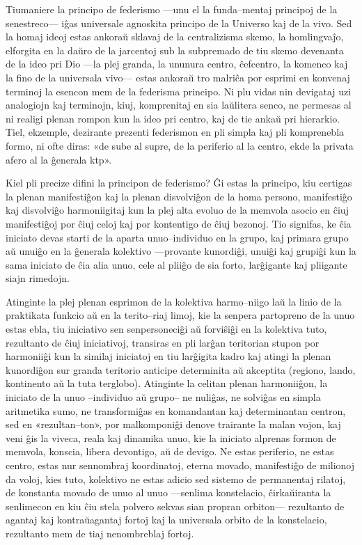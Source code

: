 Tiumaniere la principo de federismo —unu el la funda–mentaj principoj de la senestreco— iĝas universale agnoskita principo de la Universo kaj de la vivo. Sed la homaj ideoj estas ankoraŭ sklavaj de la centralizisma skemo, la homlingvaĵo, elforgita en la daŭro de la jarcentoj sub la subpremado de tiu skemo devenanta de la ideo pri Dio —la plej granda, la ununura centro, ĉefcentro, la komenco kaj la fino de la universala vivo— estas ankoraŭ tro malriĉa por esprimi en konvenaj terminoj la esencon mem de la federisma principo. Ni plu vidas nin devigataj uzi analogiojn kaj terminojn, kiuj, komprenitaj en sia laŭlitera senco, ne permesas al ni realigi plenan rompon kun la ideo pri centro, kaj de tie ankaŭ pri hierarkio. Tiel, ekzemple, dezirante prezenti federismon en pli simpla kaj pli komprenebla formo, ni ofte diras: «de sube al supre, de la periferio al la centro, ekde la privata afero al la ĝenerala ktp».

Kiel pli precize difini la principon de federismo? Ĝi estas la principo, kiu certigas la plenan manifestiĝon kaj la plenan disvolviĝon de la homa persono, manifestiĝo kaj disvolviĝo harmoniigitaj kun la plej alta evoluo de la memvola asocio en ĉiuj manifestiĝoj por ĉiuj celoj kaj por kontentigo de ĉiuj bezonoj. Tio signifas, ke ĉia iniciato devas starti de la aparta unuo–individuo en la grupo, kaj primara grupo aŭ unuiĝo en la ĝenerala kolektivo —provante kunordiĝi, unuiĝi kaj grupiĝi kun la sama iniciato de ĉia alia unuo, cele al pliiĝo de sia forto, larĝigante kaj pliigante siajn rimedojn.

Atinginte la plej plenan esprimon de la kolektiva harmo–niigo laŭ la linio de la praktikata funkcio aŭ en la terito–riaj limoj, kie la senpera partopreno de la unuo estas ebla, tiu iniciativo sen senpersoneciĝi aŭ forviŝiĝi en la kolektiva tuto, rezultanto de ĉiuj iniciativoj, transiras en pli larĝan teritorian stupon por harmoniiĝi kun la similaj iniciatoj en tiu larĝigita kadro kaj atingi la plenan kunordiĝon sur granda teritorio anticipe determinita aŭ akceptita (regiono, lando, kontinento aŭ la tuta terglobo). Atinginte la celitan plenan harmoniiĝon, la iniciato de la unuo –individuo aŭ grupo– ne nuliĝas, ne solviĝas en simpla aritmetika sumo, ne transformiĝas en komandantan kaj determinantan centron, sed en «rezultan–ton», por malkomponiĝi denove trairante la malan vojon, kaj veni ĝis la viveca, reala kaj dinamika unuo, kie la iniciato alprenas formon de memvola, konscia, libera devontigo, aŭ de devigo. Ne estas periferio, ne estas centro, estas nur sennombraj koordinatoj, eterna movado, manifestiĝo de milionoj da voloj, kies tuto, kolektivo ne estas adicio sed sistemo de permanentaj rilatoj, de konstanta movado de unuo al unuo —senlima konstelacio, ĉirkaŭiranta la senlimecon en kiu ĉiu stela polvero sekvas sian propran orbiton— rezultanto de agantaj kaj kontraŭagantaj fortoj kaj la universala orbito de la konstelacio, rezultanto mem de tiaj nenombreblaj fortoj.

